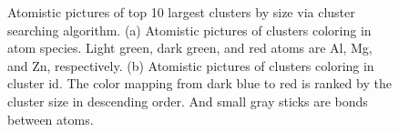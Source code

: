\begingroup
\begin{figure}[!ht]
  \centering
\caption[Atomistic pictures of top 10 largest clusters by size via cluster searching algorithm.]{Atomistic pictures of top 10 largest clusters by size via cluster searching algorithm. (a) Atomistic pictures of clusters coloring in atom species. Light green, dark green, and red atoms are Al, Mg, and Zn, respectively. (b) Atomistic pictures of clusters coloring in cluster id. The color mapping from dark blue to red is ranked by the cluster size in descending order. And small gray sticks are bonds between atoms.}
\label{Chap:Al/Vac:fig:illu_cluster}
\end{figure}
\endgroup

